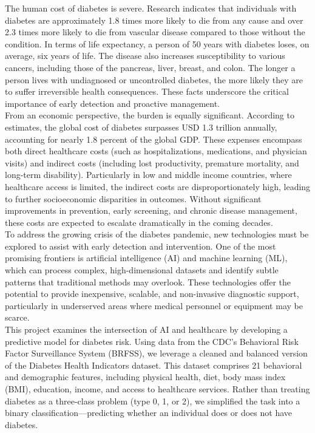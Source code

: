 \documentclass[conference]{IEEEtran}
\begin{document}
The human cost of diabetes is severe. Research indicates that individuals with diabetes are approximately 1.8 times more likely to die from any cause and over 2.3 times more likely to die from vascular disease compared to those without the condition. In terms of life expectancy, a person of 50 years with diabetes loses, on average, six years of life. The disease also increases susceptibility to various cancers, including those of the pancreas, liver, breast, and colon. The longer a person lives with undiagnosed or uncontrolled diabetes, the more likely they are to suffer irreversible health consequences.  \cite{Sarwar2010Diabetes} These facts underscore the critical importance of early detection and proactive management. \\

From an economic perspective, the burden is equally significant. According to estimates, the global cost of diabetes surpasses USD 1.3 trillion annually, accounting for nearly 1.8 percent of the global GDP. These expenses encompass both direct healthcare costs (such as hospitalizations, medications, and physician visits) and indirect costs (including lost productivity, premature mortality, and long-term disability). Particularly in low and middle income countries, where healthcare access is limited, the indirect costs are disproportionately high, leading to further socioeconomic disparities in outcomes. \cite{Bommer2017Global} Without significant improvements in prevention, early screening, and chronic disease management, these costs are expected to escalate dramatically in the coming decades. \\

To address the growing crisis of the diabetes pandemic, new technologies must be explored to assist with early detection and intervention. One of the most promising frontiers is artificial intelligence (AI) and machine learning (ML), which can process complex, high-dimensional datasets and identify subtle patterns that traditional methods may overlook. These technologies offer the potential to provide inexpensive, scalable, and non-invasive diagnostic support, particularly in underserved areas where medical personnel or equipment may be scarce. \\

This project examines the intersection of AI and healthcare by developing a predictive model for diabetes risk. Using data from the CDC’s Behavioral Risk Factor Surveillance System (BRFSS), we leverage a cleaned and balanced version of the Diabetes Health Indicators dataset. This dataset comprises 21 behavioral and demographic features, including physical health, diet, body mass index (BMI), education, income, and access to healthcare services. Rather than treating diabetes as a three-class problem (type 0, 1, or 2), we simplified the task into a binary classification—predicting whether an individual does or does not have diabetes. \\
\end{document}
